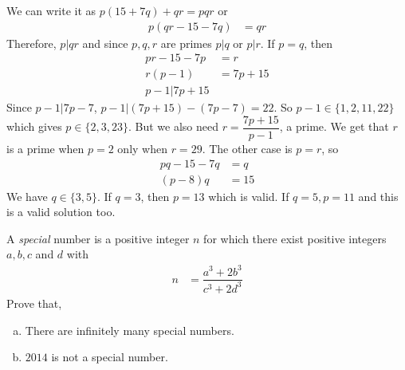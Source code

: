 \documentclass[problems.tex]{subfile}
\begin{document}
	\begin{solution}
		We can write it as $p(15+7q)+qr=pqr$ or
			\begin{align*}
				p(qr-15-7q) & = qr
			\end{align*}
		Therefore, $p|qr$ and since $p,q,r$ are primes $p|q$ or $p|r$. If $p=q$, then
			\begin{align*}
				pr-15-7p & = r\\
				r(p-1) & = 7p+15\\
				p-1|7p+15
			\end{align*}
		Since $p-1|7p-7$, $p-1|(7p+15)-(7p-7)=22$. So $p-1\in\{1,2,11,22\}$ which gives $p\in\{2,3,23\}$. But we also need $r=\dfrac{7p+15}{p-1}$, a prime. We get that $r$ is a prime when $p=2$ only when $r=29$. The other case is $p=r$, so
			\begin{align*}
				pq-15-7q & = q\\
				(p-8)q & = 15
			\end{align*}
		We have $q\in\{3,5\}$. If $q=3$, then $p=13$ which is valid. If $q=5,p=11$ and this is a valid solution too.
	\end{solution}
	
	\begin{problem}[Serbia $2014$]
		A \textit{special} number is a positive integer $n$ for which there exist positive integers $a, b, c$ and $d$ with
			\begin{align*}
				n & = \dfrac{a^3+2b^3}{c^3+2d^3}
			\end{align*}
		Prove that,	
			\begin{enumerate}[a.]
				\item There are infinitely many special numbers.
				\item $2014$ is not a special number.
			\end{enumerate}
	\end{problem}
	
\end{document}
